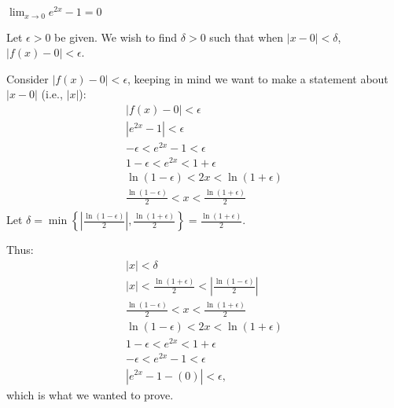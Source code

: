 {$\displaystyle \lim_{x\to 0} e^{2x}-1 = 0$}
{Let $\epsilon >0$ be given. We wish to find $\delta >0$ such that when $|x-0|<\delta$, $|f(x)-0|<\epsilon$. 

Consider $|f(x)-0|<\epsilon$, keeping in  mind we want to make a statement about $|x-0|$ (i.e., $|x|$):
\begin{gather*}
|f(x) -0 | < \epsilon \\
|e^{2x}-1 |<\epsilon \\
-\epsilon< e^{2x}-1 < \epsilon \\
1-\epsilon< e^{2x} < 1+\epsilon \\
\ln (1-\epsilon) < 2x < \ln (1+\epsilon) \\
\frac{\ln (1-\epsilon)}{2} < x < \frac{\ln (1+\epsilon)}{2} \\
\end{gather*}
Let $\delta = \min\left\{\left|\frac{\ln(1-\epsilon)}{2}\right|,\frac{\ln(1+\epsilon)}{2}\right\}=\frac{\ln(1+\epsilon)}{2}.$

Thus:
\begin{gather*}
|x| < \delta \\
|x| <\frac{\ln(1+\epsilon)}{2}<\left|\frac{\ln(1-\epsilon)}{2}\right| \\
\frac{\ln(1-\epsilon)}{2} < x < \frac{\ln(1+\epsilon)}{2}\\
\ln(1-\epsilon)< 2x < \ln(1+\epsilon)\\
1-\epsilon < e^{2x} < 1+\epsilon\\
-\epsilon < e^{2x}-1 < \epsilon\\
|e^{2x}-1-(0)| < \epsilon,
\end{gather*}
which is what we wanted to prove.
}




